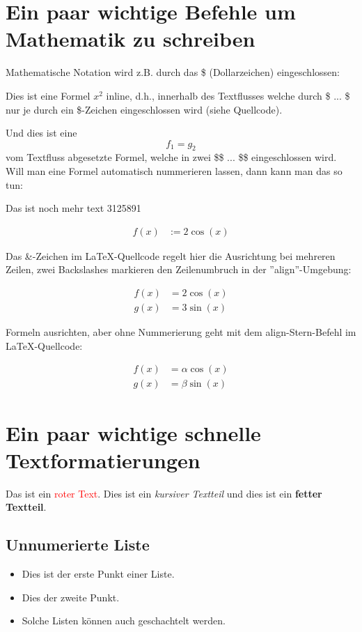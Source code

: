 \section{Ein paar wichtige Befehle um Mathematik zu schreiben}

Mathematische Notation wird z.B. durch das \$ (Dollarzeichen) eingeschlossen: 

Dies ist eine Formel $x^2$ inline, d.h., innerhalb des Textflusses welche durch \$ ... \$ nur je durch ein \$-Zeichen eingeschlossen wird (siehe Quellcode).

Und dies ist eine $$f_1 = g_2$$ vom Textfluss abgesetzte Formel, welche in zwei \$\$ ... \$\$ eingeschlossen wird. Will man eine Formel automatisch nummerieren lassen, dann kann man das so tun:

Das ist noch mehr text 3125891

\begin{align}
  f(x) &:= 2 \cos(x) 
\end{align}

Das \&-Zeichen im LaTeX-Quellcode regelt hier die Ausrichtung bei mehreren Zeilen, zwei Backslashes markieren den Zeilenumbruch in der ''align''-Umgebung:

\begin{align}
  f(x) &= 2 \cos(x) \\
  g(x) &= 3 \sin(x)
\end{align}    

Formeln ausrichten, aber ohne Nummerierung geht mit dem align-Stern-Befehl im LaTeX-Quellcode:

\begin{align*}
  f(x) &= \alpha \cos(x) \\
  g(x) &= \beta \sin(x)
\end{align*}    

\section{Ein paar wichtige schnelle Textformatierungen}

Das ist ein \textcolor{red}{roter Text}. Dies ist ein {\itshape kursiver Textteil} und dies ist ein {\bfseries fetter Textteil}. 

\subsection{Unnumerierte Liste}

\begin{itemize}
  \item Dies ist der erste Punkt einer Liste.
    \item Dies der zweite Punkt.
    \item Solche Listen können auch geschachtelt werden.
\end{itemize} 

